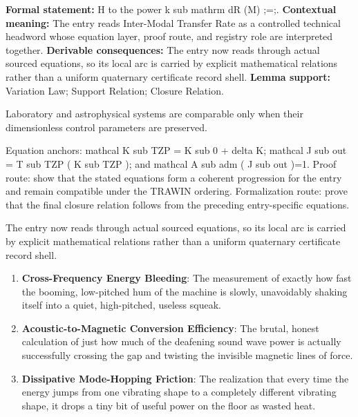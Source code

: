 \begingroup\footnotesize\setlength{\emergencystretch}{3em}\sloppy
\textbf{Formal statement:} H to the power k sub mathrm dR (M) ;=;. \textbf{Contextual meaning:} The entry reads Inter-Modal Transfer Rate as a controlled technical headword whose equation layer, proof route, and registry role are interpreted together. \textbf{Derivable consequences:} The entry now reads through actual sourced equations, so its local arc is carried by explicit mathematical relations rather than a uniform quaternary certificate record shell. \textbf{Lemma support:} Variation Law; Support Relation; Closure Relation.\par
\endgroup

Laboratory and astrophysical systems are comparable only when their dimensionless control parameters are preserved.

Equation anchors: mathcal K sub TZP = K sub 0 + delta K; mathcal J sub out = T sub TZP ( K sub TZP ); and mathcal A sub adm ( J sub out )=1. Proof route: show that the stated equations form a coherent progression for the entry and remain compatible under the TRAWIN ordering. Formalization route: prove that the final closure relation follows from the preceding entry-specific equations.

The entry now reads through actual sourced equations, so its local arc is carried by explicit mathematical relations rather than a uniform quaternary certificate record shell.
\endgroup

\begin{enumerate}[leftmargin=1.6em,itemsep=6pt,topsep=4pt]
\item \textbf{Cross-Frequency Energy Bleeding}: The measurement of exactly how fast the booming, low-pitched hum of the machine is slowly, unavoidably shaking itself into a quiet, high-pitched, useless squeak.
\item \textbf{Acoustic-to-Magnetic Conversion Efficiency}: The brutal, honest calculation of just how much of the deafening sound wave power is actually successfully crossing the gap and twisting the invisible magnetic lines of force.
\item \textbf{Dissipative Mode-Hopping Friction}: The realization that every time the energy jumps from one vibrating shape to a completely different vibrating shape, it drops a tiny bit of useful power on the floor as wasted heat.
\end{enumerate}

